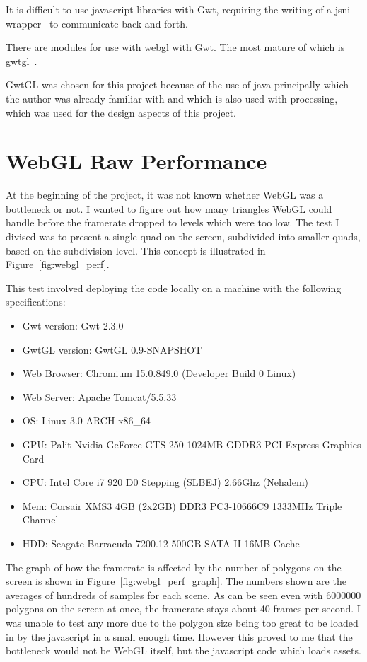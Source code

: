 It is difficult to use javascript libraries with Gwt, requiring the writing of a jsni wrapper~\cite{web:jsni} to communicate back and forth.

There are modules for use with webgl with Gwt.
The most mature of which is gwtgl~\cite{web:gwtgl}.

GwtGL was chosen for this project because of the use of java principally which the author was already familiar with and which is also used with processing, which was used for the design aspects of this project.

\section{WebGL Raw Performance}
At the beginning of the project, it was not known whether WebGL was a bottleneck or not.
I wanted to figure out how many triangles WebGL could handle before the framerate dropped to levels which were too low.
The test I divised was to present a single quad on the screen, subdivided into smaller quads, based on the subdivision level.
This concept is illustrated in Figure~\ref{fig:webgl_perf}.

This test involved deploying the code locally on a machine with the following specifications:
\begin{itemize}
	\item Gwt version: Gwt 2.3.0
	\item GwtGL version: GwtGL 0.9-SNAPSHOT
	\item Web Browser: Chromium 15.0.849.0 (Developer Build 0 Linux)
	\item Web Server: Apache Tomcat/5.5.33
	\item OS: Linux 3.0-ARCH x86\_64
	\item GPU: Palit Nvidia GeForce GTS 250 1024MB GDDR3 PCI-Express Graphics Card
	\item CPU: Intel Core i7 920 D0 Stepping (SLBEJ) 2.66Ghz (Nehalem)
	\item Mem: Corsair XMS3 4GB (2x2GB) DDR3 PC3-10666C9 1333MHz Triple Channel
	\item HDD: Seagate Barracuda 7200.12 500GB SATA-II 16MB Cache
\end{itemize}

The graph of how the framerate is affected by the number of polygons on the screen is shown in Figure~\ref{fig:webgl_perf_graph}.
The numbers shown are the averages of hundreds of samples for each scene.
As can be seen even with 6000000 polygons on the screen at once, the framerate stays about 40 frames per second.
I was unable to test any more due to the polygon size being too great to be loaded in by the javascript in a small enough time.
However this proved to me that the bottleneck would not be WebGL itself, but the javascript code which loads assets.


